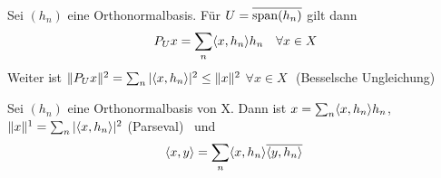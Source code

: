 \begin{satz} \label{satz:16.7}
	Sei $(h_{n})$ eine Orthonormalbasis. Für $U = \overline{\operatorname{span}(h_{n})}$ gilt dann
		\[ P_{U} x = \sum_{n} \langle x, h_{n} \rangle h_{n} \quad \forall x \in X \]
	Weiter ist $\| P_{U} x \|^{2} = \sum_{n} | \langle x , h_{n} \rangle |^{2} \leq \| x \|^{2}$ $\forall x \in X$ $ $ (Besselsche Ungleichung) 
\end{satz}


\begin{kor} \label{kor:16.8}
	Sei $(h_{n})$ eine Orthonormalbasis von X. Dann ist $x = \sum_{n} \langle x, h_{n} \rangle h_{n}$, $\| x \|^{1} = \sum_{n} | \langle x, h_{n} \rangle |^{2}$ (Parseval)  und
		\[ \< x , y \> = \sum_{n} \< x, h_{n} \> \overline{\< y , h_{n} \>} \]
\end{kor}

